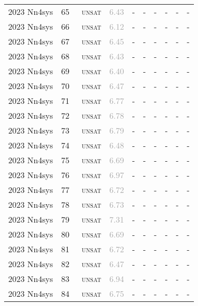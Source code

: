 \begin{center}
{\begin{longtable}{@{}llllllllll@{}}
2023 Nn4sys & 65 & ~\textsc{unsat} & \textcolor{darkgray}{6.43} & - & - & - & - & - & - \\
2023 Nn4sys & 66 & ~\textsc{unsat} & \textcolor{darkgray}{6.12} & - & - & - & - & - & - \\
2023 Nn4sys & 67 & ~\textsc{unsat} & \textcolor{darkgray}{6.45} & - & - & - & - & - & - \\
2023 Nn4sys & 68 & ~\textsc{unsat} & \textcolor{darkgray}{6.43} & - & - & - & - & - & - \\
2023 Nn4sys & 69 & ~\textsc{unsat} & \textcolor{darkgray}{6.40} & - & - & - & - & - & - \\
2023 Nn4sys & 70 & ~\textsc{unsat} & \textcolor{darkgray}{6.47} & - & - & - & - & - & - \\
2023 Nn4sys & 71 & ~\textsc{unsat} & \textcolor{darkgray}{6.77} & - & - & - & - & - & - \\
2023 Nn4sys & 72 & ~\textsc{unsat} & \textcolor{darkgray}{6.78} & - & - & - & - & - & - \\
2023 Nn4sys & 73 & ~\textsc{unsat} & \textcolor{darkgray}{6.79} & - & - & - & - & - & - \\
2023 Nn4sys & 74 & ~\textsc{unsat} & \textcolor{darkgray}{6.48} & - & - & - & - & - & - \\
2023 Nn4sys & 75 & ~\textsc{unsat} & \textcolor{darkgray}{6.69} & - & - & - & - & - & - \\
2023 Nn4sys & 76 & ~\textsc{unsat} & \textcolor{darkgray}{6.97} & - & - & - & - & - & - \\
2023 Nn4sys & 77 & ~\textsc{unsat} & \textcolor{darkgray}{6.72} & - & - & - & - & - & - \\
2023 Nn4sys & 78 & ~\textsc{unsat} & \textcolor{darkgray}{6.73} & - & - & - & - & - & - \\
2023 Nn4sys & 79 & ~\textsc{unsat} & \textcolor{darkgray}{7.31} & - & - & - & - & - & - \\
2023 Nn4sys & 80 & ~\textsc{unsat} & \textcolor{darkgray}{6.69} & - & - & - & - & - & - \\
2023 Nn4sys & 81 & ~\textsc{unsat} & \textcolor{darkgray}{6.72} & - & - & - & - & - & - \\
2023 Nn4sys & 82 & ~\textsc{unsat} & \textcolor{darkgray}{6.47} & - & - & - & - & - & - \\
2023 Nn4sys & 83 & ~\textsc{unsat} & \textcolor{darkgray}{6.94} & - & - & - & - & - & - \\
2023 Nn4sys & 84 & ~\textsc{unsat} & \textcolor{darkgray}{6.75} & - & - & - & - & - & - \\

\end{longtable}}
\end{center}
